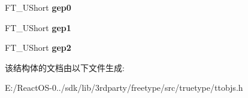 \begin{DoxyCompactItemize}
\item 
\mbox{\label{struct_t_t___graphics_state___a8b6e76bd6f9493f3df09759c17d6d1c4}} 
F\+T\+\_\+\+U\+Short {\bfseries gep0}
\item 
\mbox{\label{struct_t_t___graphics_state___a4972ffa833fb9eddfef7a79f609c6597}} 
F\+T\+\_\+\+U\+Short {\bfseries gep1}
\item 
\mbox{\label{struct_t_t___graphics_state___a9e55b1d71dd655064cdb01ce68f7592a}} 
F\+T\+\_\+\+U\+Short {\bfseries gep2}
\end{DoxyCompactItemize}


该结构体的文档由以下文件生成\+:\begin{DoxyCompactItemize}
\item 
E\+:/\+React\+O\+S-\/0../sdk/lib/3rdparty/freetype/src/truetype/ttobjs.\+h\end{DoxyCompactItemize}
